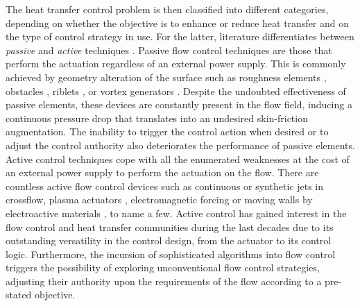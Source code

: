 The heat transfer control problem is then classified into different categories, depending on whether the objective is to enhance or reduce heat transfer and on the type of control strategy in use. For the latter, literature differentiates between \textit{passive} and \textit{active} techniques \citep[\eg][]{webb2005enhanced}. Passive flow control techniques are those that perform the actuation regardless of an external power supply. This is commonly achieved by geometry alteration of the surface such as roughness elements \citep{Hwang1995roughness,Hechuan2018ratchet}, obstacles \citep{mallor2018cubes}, riblets \citep{Mallor2019ribPOD}, or vortex generators \citep{Awais2018review,Ke2019VG}. Despite the undoubted effectiveness of passive elements, these devices are constantly present in the flow field, inducing a continuous pressure drop that translates into an undesired skin-friction augmentation. The inability to trigger the control action when desired or to adjust the control authority also deteriorates the performance of passive elements. Active control techniques cope with all the enumerated weaknesses at the cost of an external power supply to perform the actuation on the flow. There are countless active flow control devices such as continuous \citep{puzu2019jet} or synthetic \citep{Giachetti2018synjet} jets in crossflow, plasma actuators \citep{roy2008plasma}, electromagnetic forcing \citep{Kenjere2008EMheat} or moving walls by electroactive materials \citep{Leal2013rev_electroactive}, to name a few. Active control has gained interest in the flow control and heat transfer communities during the last decades due to its outstanding versatility in the control design, from the actuator to its control logic. Furthermore, the incursion of sophisticated algorithms into flow control triggers the possibility of exploring unconventional flow control strategies, adjusting their authority upon the requirements of the flow according to a pre-stated objective.

